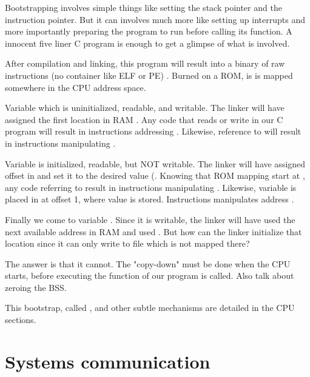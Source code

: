 Bootstrapping involves simple things like setting the stack pointer and the instruction pointer. But it can involves much more like setting up interrupts and more importantly preparing the program to run before calling its   function. A innocent five liner C program is enough to get a glimpse of what is involved.



After compilation and linking, this program will result into a binary of raw instructions (no container like ELF or PE) . Burned on a ROM, is is mapped somewhere in the CPU address space.


Variable  which is uninitialized, readable, and writable. The linker will have assigned the first location in RAM . Any code that reads or write  in our C program will result in instructions addressing . Likewise, reference to  will result in instructions manipulating .

Variable   is initialized, readable, but NOT writable. The linker will have assigned offset  in  and set it to the desired value (. Knowing that ROM mapping start at , any code referring to  result in instructions manipulating . Likewise, variable  is placed in  at offset 1, where value  is stored. Instructions manipulates address .

Finally we come to variable . Since it is writable, the linker will have used the next available address in RAM and used . But how can the linker initialize that location since it can only write to file  which is not mapped there? 

The answer is that it cannot. The "copy-down" must be done when the CPU starts, before executing the  function of our program is called. Also talk about zeroing the BSS.

This bootstrap, called , and other subtle mechanisms are detailed in the CPU sections.





\section{Systems communication}


